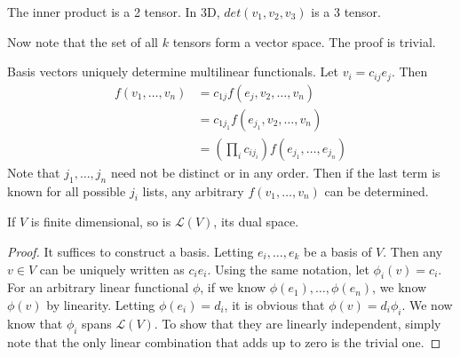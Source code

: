 \documentclass[12pt]{article}
\begin{document}
\begin{ex}
    The inner product is a 2 tensor. In 3D, $det(v_1,v_2,v_3)$ is a 3 tensor.
\end{ex}

Now note that the set of all $k$ tensors form a vector space. The proof is trivial.

\begin{lem}
    Basis vectors uniquely determine multilinear functionals. Let $v_i = c_{ij}e_j$. Then
    \begin{align*}
        f(v_1,\dots,v_n) &= c_{1j}f(e_j,v_2,\dots,v_n) \\
                         &= c_{1j_1}f(e_{j_1},v_2,\dots,v_n) \\
                         &= \left(\prod_i c_{ij_i}\right) f(e_{j_1},\dots,e_{j_n})
    \end{align*}
    Note that $j_1,\dots,j_n$ need not be distinct or in any order. Then if the last term is known for all possible $j_i$ lists, any arbitrary $f(v_1,\dots,v_n)$ can be determined.
\end{lem}

\begin{lem}
    If $V$ is finite dimensional, so is $\mathcal L(V)$, its dual space.
\end{lem}

\begin{proof}
    It suffices to construct a basis. Letting $e_i,\dots,e_k$ be a basis of $V$. Then any $v \in V$ can be uniquely written as $c_ie_i$. Using the same notation, let $\phi_i(v) = c_i$. For an arbitrary linear functional $\phi$, if we know $\phi(e_1),\dots,\phi(e_n)$, we know $\phi(v)$ by linearity. Letting $\phi(e_i) = d_i$, it is obvious that $\phi(v) = d_i\phi_i$. We now know that $\phi_i$ spans $\mathcal L(V)$. To show that they are linearly independent, simply note that the only linear combination that adds up to zero is the trivial one.
\end{proof}
\end{document}
